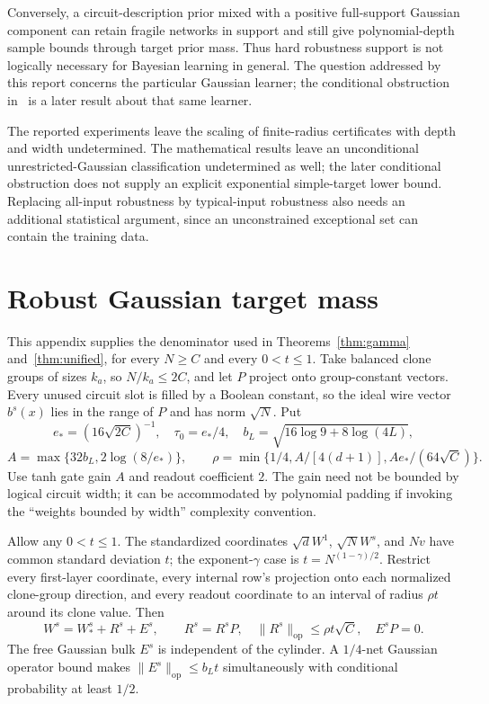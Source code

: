 \documentclass[11pt]{article}
\newcommand{\op}{\mathrm{op}}
\begin{document}
Conversely, a circuit-description prior mixed with a positive full-support
Gaussian component can retain fragile networks in support and still give
polynomial-depth sample bounds through target prior mass. Thus hard robustness
support is not logically necessary for Bayesian learning in general.
The question addressed by this report concerns the particular Gaussian
learner; the conditional obstruction in~\cite{conditional2026} is a later
result about that same learner.

The reported experiments leave the scaling of finite-radius certificates
with depth and width undetermined. The mathematical results leave an
unconditional unrestricted-Gaussian classification undetermined as well;
the later conditional obstruction does not supply an explicit exponential
simple-target lower bound. Replacing all-input robustness by typical-input
robustness also needs an additional statistical argument, since an
unconstrained exceptional set can contain the training data.

\appendix
\section{Robust Gaussian target mass}\label{sec:cylinder}

This appendix supplies the denominator used in Theorems~\ref{thm:gamma}
and~\ref{thm:unified}, for every $N\ge C$ and every $0<t\le1$.
Take balanced clone groups of sizes $k_a$, so $N/k_a\le2C$, and let $P$
project onto group-constant vectors. Every unused circuit slot is filled by
a Boolean constant, so the ideal wire vector $b^s(x)$ lies in the range of
$P$ and has norm $\sqrt N$.
Put
\[
 e_*=(16\sqrt{2C})^{-1},\quad \tau_0=e_*/4,\quad
 b_L=\sqrt{16\log9+8\log(4L)},
\]
\[
 A=\max\{32b_L,2\log(8/e_*)\},\qquad
 \rho=\min\{1/4,A/[4(d+1)],Ae_*/(64\sqrt C)\}.
\]
Use tanh gate gain $A$ and readout coefficient $2$. The gain need not be
bounded by logical circuit width; it can be accommodated by polynomial
padding if invoking the ``weights bounded by width'' complexity convention.

Allow any $0<t\le1$. The standardized coordinates
$\sqrt d W^1$, $\sqrt N W^s$, and $Nv$ have common standard deviation $t$;
the exponent-$\gamma$ case is $t=N^{(1-\gamma)/2}$.
Restrict every first-layer coordinate, every
internal row's projection onto each normalized clone-group direction, and
every readout coordinate to an interval of radius $\rho t$ around its clone
value. Then
\[
 W^s=W_*^s+R^s+E^s,\qquad R^s=R^sP,
 \quad\|R^s\|_\op\le\rho t\sqrt C,\quad E^sP=0.
\]
The free Gaussian bulk $E^s$ is independent of the cylinder. A $1/4$-net
Gaussian operator bound makes $\|E^s\|_\op\le b_Lt$ simultaneously with
conditional probability at least $1/2$.
\end{document}
